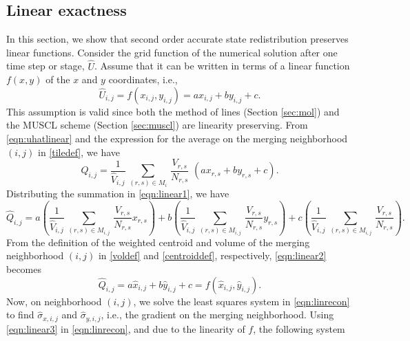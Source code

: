 \subsection{Linear exactness} \label{sec:linex}
In this section, we show that second order accurate state redistribution preserves linear functions.
Consider the grid function of the numerical solution after one time step
or stage, $\widehat{U}$.  Assume that it can be written in terms of a linear function $f(x,y)$ of the $x$ and $y$ coordinates, i.e.,
\begin{equation}
    \label{eqn:uhatlinear}
\widehat{U}_{i,j} = f(x_{i,j},y_{i,j}) = ax_{i,j} + by_{i,j} + c.
\end{equation}
This assumption is valid since both the method of lines (Section \ref{sec:mol}) and the MUSCL scheme (Section \ref{sec:muscl}) are linearity preserving.  
From \eqref{eqn:uhatlinear} and the expression for the average on the merging neighborhood $(i,j)$ in \eqref{tiledef}, we have
\begin{equation}
    \label{eqn:linear1}
\widehat{Q}_{i,j} = \frac{1}{{\widehat V}_{i,j}} \, \sum_{(r,s) \in M_i} \,  
\frac{V_{r,s}}{N_{r,s}}  \,\, (ax_{r,s} + by_{r,s} + c).
\end{equation}
Distributing the summation in \eqref{eqn:linear1}, we have
\begin{equation}\label{eqn:linear2}
\widehat{Q}_{i,j} =  a \left(\frac{1}{{\widehat V}_{i,j}} \, \sum_{(r,s) \in M_{i,j}} \,  
\frac{V_{r,s}}{N_{r,s}} x_{r,s} \right) + b\left(\frac{1}{{\widehat V}_{i,j}} \, \sum_{(r,s) \in M_{i,j}} \,  
\frac{V_{r,s}}{N_{r,s}} y_{r,s} \right) + c\left(\frac{1}{{\widehat V}_{i,j}} \, \sum_{(r,s) \in M_{i,j}} \,
\frac{V_{r,s}}{N_{r,s}}\right) .
\end{equation}
From the definition of the weighted centroid and volume of the merging neighborhood
$(i,j)$ in \eqref{voldef} and \eqref{centroiddef}, respectively, \eqref{eqn:linear2} becomes
\begin{equation}\label{eqn:linear3}
\widehat{Q}_{i,j} =  a \widehat{x}_{i,j} + b\widehat{y}_{i,j} + c = f(\widehat{x}_{i,j},\widehat{y}_{i,j}).
\end{equation}
Now, on neighborhood $(i,j)$, we solve the least squares system in
\eqref{eqn:linrecon} to find $\widehat{\sigma}_{x,i,j}$ and
$\widehat{\sigma}_{y,i,j}$, i.e., the gradient on the merging neighborhood.  Using
\eqref{eqn:linear3} in \eqref{eqn:linrecon}, and due to the linearity of $f$, the following system
